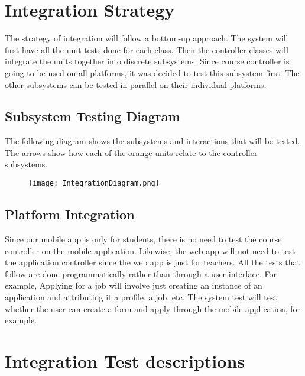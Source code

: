 \documentclass[12pt]{report}
\begin{document}
\section{Integration Strategy}

The strategy of integration will follow a bottom-up approach. The system will first have all the
unit tests done for each class. Then the controller classes will integrate the units together into
discrete subsystems. Since course controller is going to be used on all platforms, it was decided to
test this subsystem first. The other subsystems can be tested in parallel on their individual
platforms.
 \subsection{Subsystem Testing Diagram}
	The following diagram shows the subsystems and interactions that will be tested. The arrows show
	how each of the orange units relate to the controller subsystems. 
 \begin{figure}[H]
    \centering
    \texttt{[image: IntegrationDiagram.png]}
 \end{figure}
 \subsection{Platform Integration}
 
Since our mobile app is only for students, there is no need to test the course controller on the mobile
application. Likewise, the web app will not need to test the application controller since the web app
is just for teachers. All the tests that follow are done programmatically rather than through a user
interface. For example, Applying for a job will involve just creating an instance of an application
and attributing it a profile, a job, etc. The system test will test whether the user can create a
form and apply through the mobile application, for example.
 
\section{Integration Test descriptions}
\end{document}
